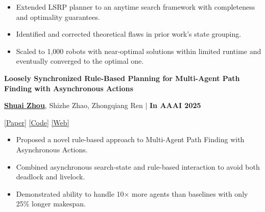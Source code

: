 \documentclass[a4paper,9pt]{extarticle}
\begin{document}
\begin{itemize} 
    \item Extended LSRP planner to an anytime search framework with completeness and optimality guarantees.
    \item Identified and corrected theoretical flaws in prior work's state grouping.
    \item Scaled to 1,000 robots with near-optimal solutions within limited runtime and eventually converged to the optimal one. 
\end{itemize} 
\par\textbf{Loosely Synchronized Rule-Based Planning for
Multi-Agent Path Finding with Asynchronous Actions}
\par\textup{\underline{\textbf{Shuai Zhou}}, Shizhe Zhao, Zhongqiang Ren   \hfill | \textbf{In AAAI 2025}}  %
\par\textup{\textbar{} \href{https://doi.org/10.1609/aaai.v39i14.33618}{[Paper]}  \textbar{} \href{https://github.com/rap-lab-org/public_LSRP}{[Code]}  \textbar{} \href{https://rap-lab.github.io/research/mapfaa}{[Web]} \textbar{}}
\begin{itemize}
    \item  Proposed a novel rule-based approach to Multi-Agent Path Finding with Asynchronous Actions.
    \item Combined asynchronous search-state and rule-based interaction to avoid both deadlock and livelock.
    \item Demonstrated ability to handle 10× more agents than baselines with only 25\% longer makespan.
\end{itemize}
\end{document}
